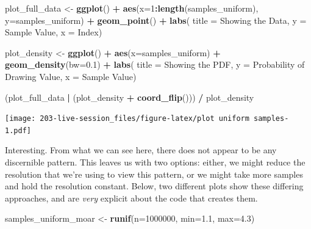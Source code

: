 \documentclass[
]{book}
\newenvironment{Shaded}{\begin{snugshade}}{\end{snugshade}}
\newcommand{\AttributeTok}[1]{\textcolor[rgb]{0.13,0.29,0.53}{#1}}
\newcommand{\DecValTok}[1]{\textcolor[rgb]{0.00,0.00,0.81}{#1}}
\newcommand{\FloatTok}[1]{\textcolor[rgb]{0.00,0.00,0.81}{#1}}
\newcommand{\FunctionTok}[1]{\textcolor[rgb]{0.13,0.29,0.53}{\textbf{#1}}}
\newcommand{\NormalTok}[1]{#1}
\newcommand{\OtherTok}[1]{\textcolor[rgb]{0.56,0.35,0.01}{#1}}
\newcommand{\SpecialCharTok}[1]{\textcolor[rgb]{0.81,0.36,0.00}{\textbf{#1}}}
\newcommand{\StringTok}[1]{\textcolor[rgb]{0.31,0.60,0.02}{#1}}
\theoremstyle{definition}
\theoremstyle{definition}
\theoremstyle{definition}
\theoremstyle{definition}
\theoremstyle{remark}
\begin{document}
\begin{Shaded}
\begin{Highlighting}[]
\NormalTok{plot\_full\_data }\OtherTok{\textless{}{-}} \FunctionTok{ggplot}\NormalTok{() }\SpecialCharTok{+} 
  \FunctionTok{aes}\NormalTok{(}\AttributeTok{x=}\DecValTok{1}\SpecialCharTok{:}\FunctionTok{length}\NormalTok{(samples\_uniform), }\AttributeTok{y=}\NormalTok{samples\_uniform) }\SpecialCharTok{+} 
  \FunctionTok{geom\_point}\NormalTok{()  }\SpecialCharTok{+} 
  \FunctionTok{labs}\NormalTok{(}
    \AttributeTok{title =} \StringTok{\textquotesingle{}Showing the Data\textquotesingle{}}\NormalTok{, }
    \AttributeTok{y     =} \StringTok{\textquotesingle{}Sample Value\textquotesingle{}}\NormalTok{, }
    \AttributeTok{x     =} \StringTok{\textquotesingle{}Index\textquotesingle{}}\NormalTok{)}

\NormalTok{plot\_density }\OtherTok{\textless{}{-}} \FunctionTok{ggplot}\NormalTok{() }\SpecialCharTok{+} 
  \FunctionTok{aes}\NormalTok{(}\AttributeTok{x=}\NormalTok{samples\_uniform) }\SpecialCharTok{+} 
  \FunctionTok{geom\_density}\NormalTok{(}\AttributeTok{bw=}\FloatTok{0.1}\NormalTok{)   }\SpecialCharTok{+} 
  \FunctionTok{labs}\NormalTok{(}
    \AttributeTok{title =} \StringTok{\textquotesingle{}Showing the PDF\textquotesingle{}}\NormalTok{, }
    \AttributeTok{y     =} \StringTok{\textquotesingle{}Probability of Drawing Value\textquotesingle{}}\NormalTok{, }
    \AttributeTok{x     =} \StringTok{\textquotesingle{}Sample Value\textquotesingle{}}\NormalTok{)}

\NormalTok{(plot\_full\_data }\SpecialCharTok{|}\NormalTok{ (plot\_density }\SpecialCharTok{+} \FunctionTok{coord\_flip}\NormalTok{())) }\SpecialCharTok{/} 
\NormalTok{  plot\_density }
\end{Highlighting}
\end{Shaded}

\texttt{[image: 203-live-session\_files/figure-latex/plot uniform samples-1.pdf]}

Interesting. From what we can see here, there does not appear to be any discernible pattern. This leaves us with two options: either, we might reduce the resolution that we're using to view this pattern, or we might take more samples and hold the resolution constant. Below, two different plots show these differing approaches, and are \emph{very} explicit about the code that creates them.

\begin{Shaded}
\begin{Highlighting}[]
\NormalTok{samples\_uniform\_moar }\OtherTok{\textless{}{-}} \FunctionTok{runif}\NormalTok{(}\AttributeTok{n=}\DecValTok{1000000}\NormalTok{, }\AttributeTok{min=}\FloatTok{1.1}\NormalTok{, }\AttributeTok{max=}\FloatTok{4.3}\NormalTok{)}
\end{Highlighting}
\end{Shaded}
\end{document}

